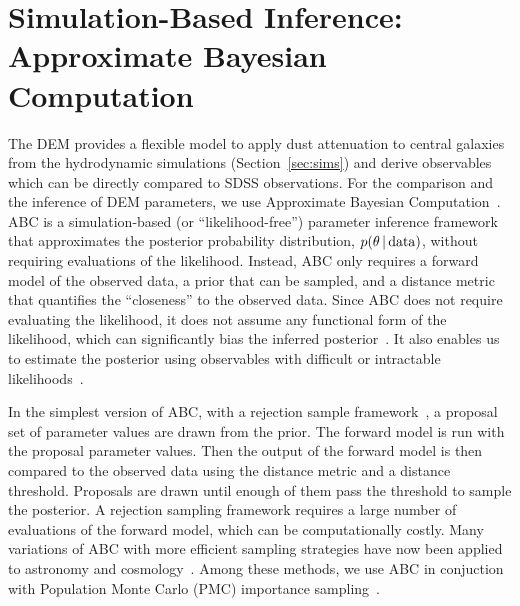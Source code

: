 \section{Simulation-Based Inference: Approximate Bayesian Computation} \label{sec:abc}
The DEM provides a flexible model to apply dust attenuation to central galaxies
from the hydrodynamic simulations (Section~\ref{sec:sims}) and derive
observables which can be directly compared to SDSS observations. For the
comparison and the inference of DEM parameters, we use Approximate Bayesian
Computation~\citep[hereafter ABC;][]{diggle1984, tavare1997, pritchard1999, beaumont2009, delmoral2012}. 
ABC is a simulation-based (or ``likelihood-free'') parameter inference
framework that approximates the posterior probability distribution,
$p(\theta\,|\,{\rm data})$, without requiring evaluations of the likelihood.
Instead, ABC only requires a forward model of the observed data, a prior that
can be sampled, and a distance metric that quantifies the ``closeness'' to the
observed data. Since ABC does not require evaluating the likelihood, it does
not assume any functional form of the likelihood, which can significantly 
bias the inferred posterior~\citep{hahn2019}. It also enables us to estimate the
posterior using observables with difficult or intractable
likelihoods~\citep{hahn2017a}.

In the simplest version of ABC, with a rejection sample
framework~\citep{pritchard1999}, a proposal set of parameter values are drawn
from the prior. The forward model is run with the proposal parameter values.
Then the output of the forward model is then compared to the observed data
using the distance metric and a distance threshold. Proposals are drawn until
enough of them pass the threshold to sample the posterior. A rejection sampling
framework requires a large number of evaluations of the forward model, which
can be computationally costly. Many variations of ABC with more efficient
sampling strategies have now been applied to astronomy and
cosmology~\citep[\eg][]{cameron2012, weyant2013, ishida2015, lin2016, alsing2018}.
Among these methods, we use ABC in conjuction with Population Monte Carlo (PMC) 
importance sampling~\citep{hahn2017a, hahn2017b, hahn2019a}.


